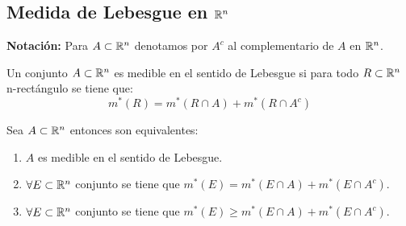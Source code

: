 \subsection{Medida de Lebesgue en $\mathbb{R}^n$}

\textbf{Notación:} Para $A \subset \mathbb{R}^n$ denotamos por $A^c$ al complementario de $A$ en $\mathbb{R}^n$.

\begin{definición}
Un conjunto $A \subset \mathbb{R}^n$ es medible en el sentido de Lebesgue si para todo $R \subset \mathbb{R}^n$ n-rectángulo se tiene que:
\[
    m^*(R) = m^*(R \cap A) + m^*(R \cap A^c)
\]
\end{definición}

\begin{proposición}
Sea $A \subset \mathbb{R}^n$ entonces son equivalentes:
\vspace{-0.5em}
\begin{enumerate}
    \item $A$ es medible en el sentido de Lebesgue.
    \item $\forall E \subset \mathbb{R}^n$ conjunto se tiene que $m^*(E) = m^*(E \cap A) + m^*(E \cap A^c)$.
    \item $\forall E \subset \mathbb{R}^n$ conjunto se tiene que $m^*(E) \geq m^*(E \cap A) + m^*(E \cap A^c)$.
\end{enumerate}
\label{prop:MedibleEquivalente}
\end{proposición}


